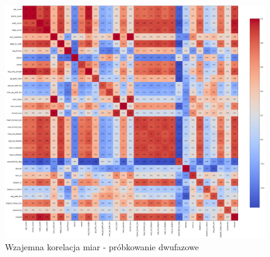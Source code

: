 \begin{figure}[h!]
    \centering
    \includegraphics[width=\textwidth]{chapters/experiments/img/twophase_corr.png}
    \caption{Wzajemna korelacja miar - próbkowanie dwufazowe}
    \label{fig:corr_twophase}
\end{figure}
